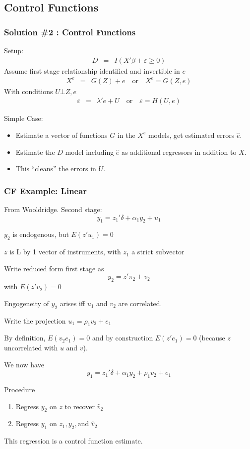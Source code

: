 \subsection{Control Functions}

       
\begin{frame}
\frametitle{Solution \#2 : Control Functions}
Setup: 
\begin{eqnarray*}
D &=& I ( X' \beta + \varepsilon \geq 0 ) 
\end{eqnarray*}
Assume first stage relationship identified and invertible in $e$
\begin{eqnarray*}
X^e &=& G(Z) +e  \quad \mbox{or}  \quad  X^e = G(Z,e)
\end{eqnarray*}
With conditions $ U \bot Z,e$
\begin{eqnarray*}
\varepsilon  &=&\lambda' e + U \quad \mbox{or}  \quad  \varepsilon = H(U,e) 
\end{eqnarray*}
       
Simple Case:
\begin{itemize}
\item Estimate a vector of functions $G$ in the $X^e$ models, get estimated errors $\hat{e}$.
\item Estimate the $D$ model including $\hat{e}$ as additional regressors in addition to $X$.
\item This ``cleans'' the errors in $U$.
\end{itemize}
\end{frame}

\begin{frame}[allowframebreaks]
       \frametitle{CF Example: Linear}
       From Wooldridge. Second stage: 
       $$y_1 = z_1'\delta + \alpha_1 y_2 + u_1$$ 

       $y_2$ is endogenous, but $E(z'u_1)=0$ 

       \medskip
       $z$ is L by 1 vector of instruments, with $z_1$ a strict subvector

       \medskip
       Write reduced form first stage as $$y_2 = z'\pi_2 + v_2$$ with $E(z'v_2)=0$

       \medskip
       Engogeneity of $y_2$ arises iff $u_1$ and $v_2$ are correlated.  

       \framebreak

       Write the projection $u_1 = \rho_1 v_2 + e_1$ 

       \medskip

       By definition, $E(v_2 e_1)=0$ and by construction $E(z'e_1)=0$ (because $z$ uncorrelated with $u$ and $v$). 

       \medskip

       We now have $$y_1 = z_1'\delta + \alpha_1 y_2 + \rho_1 v_2 + e_1$$

       Procedure
       \begin{enumerate}
              \item Regress $y_2$ on $z$ to recover $\hat v_2$ 
              \item Regress $y_1$ on $z_1, y_2, \mbox{and } \hat v_2$
       \end{enumerate}
       This regression is a \alert{control function} estimate. 
\end{frame}


